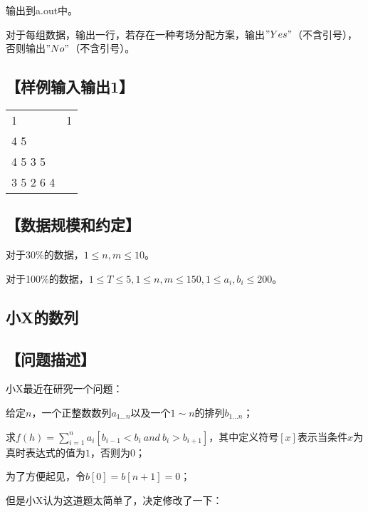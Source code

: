 \documentclass{article}
\begin{document}
			输出到a.out中。

			对于每组数据，输出一行，若存在一种考场分配方案，输出\("Yes"\)（不含引号），否则输出\("No"\)（不含引号）。

		\subsection*{【样例输入输出1】}

		\begin{table}[htbp]
		\centering
		\begin{tabular}{p{240pt}<{\raggedright}|p{240pt}<{\raggedright}}
			\hline
			1 & 1 \\
			4 5 \\ 4 5 3 5 \\ 3 5 2 6 4 \\
			\hline
		\end{tabular}
		\end{table}

		\subsection*{【数据规模和约定】}

		对于30\%的数据，\(1\leq n,m\leq 10\)。

		对于100\%的数据，\(1\leq T\leq 5,1\leq n,m\leq 150,1\leq a_i,b_i\leq 200\)。
	
	\newpage
	
	\begin{center}
		\section{小X的数列}
	\end{center}

		\subsection*{【问题描述】}
		
			小X最近在研究一个问题：

			给定\(n\)，一个正整数数列\(a_{1\ldots n}\)以及一个\(1\sim n\)的排列\(b_{1\ldots n}\)；

			求\(f(h)=\sum_{i=1}^n a_i[b_{i-1}<b_i\ and\ b_i>b_{i+1}]\)，其中定义符号\([x]\)表示当条件\(x\)为真时表达式的值为\(1\)，否则为\(0\)；

			为了方便起见，令\(b[0]=b[n+1]=0\)；

			但是小X认为这道题太简单了，决定修改了一下：
\end{document}
